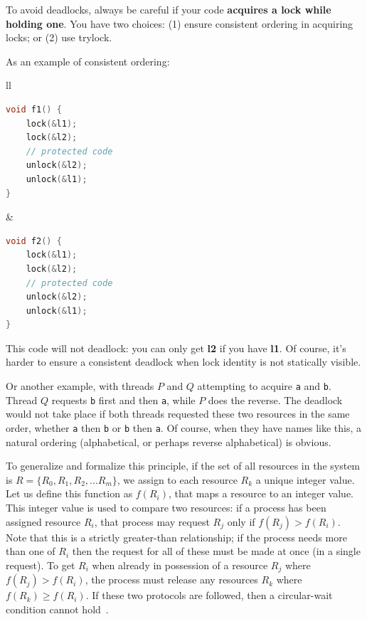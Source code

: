 \documentclass[a4paper]{report}
\begin{document}
To avoid deadlocks, always be careful if your code {\bf acquires a
  lock while holding one}.  You have two choices: (1) ensure
consistent ordering in acquiring locks; or (2) use trylock.

As an example of consistent ordering:
\begin{center}
\begin{tabular}{ll}
\begin{minipage}{.4\textwidth}
  \begin{lstlisting}[language=C]
void f1() {
    lock(&l1);
    lock(&l2);
    // protected code
    unlock(&l2);
    unlock(&l1);    
}
\end{lstlisting}
\end{minipage}&
\begin{minipage}{.4\textwidth}
\begin{lstlisting}[language=C]
void f2() {
    lock(&l1);
    lock(&l2);
    // protected code
    unlock(&l2);
    unlock(&l1);    
}
  \end{lstlisting}
\end{minipage}
\end{tabular}
\end{center}
This code will not deadlock: you can only get {\bf l2} if you have
{\bf l1}. Of course, it's harder to ensure a consistent deadlock when lock
identity is not statically visible.

Or another example, with threads $P$ and $Q$ attempting to acquire \texttt{a} and \texttt{b}. Thread $Q$ requests \texttt{b} first and then \texttt{a}, while $P$ does the reverse. The deadlock would not take place if both threads requested these two resources in the same order, whether \texttt{a} then \texttt{b} or \texttt{b} then \texttt{a}. Of course, when they have names like this, a natural ordering (alphabetical, or perhaps reverse alphabetical) is obvious. 

To generalize and formalize this principle, if the set of all resources in the system is $R = \{R_{0}, R_{1}, R_{2}, ... R_{m}\}$, we assign to each resource $R_{k}$ a unique integer value. Let us define this function as $f(R_{i})$, that maps a resource to an integer value. This integer value is used to compare two resources: if a process has been assigned resource $R_{i}$, that process may request $R_{j}$ only if $f(R_{j}) > f(R_{i})$. Note that this is a strictly greater-than relationship; if the process needs more than one of $R_{i}$ then the request for all of these must be made at once (in a single request). To get $R_{i}$ when already in possession of a resource $R_{j}$ where $f(R_{j}) > f(R_{i})$, the process must release any resources $R_{k}$ where $f(R_{k}) \geq f(R_{i})$. If these two protocols are followed, then a circular-wait condition cannot hold~\cite{osc}.
\end{document}
